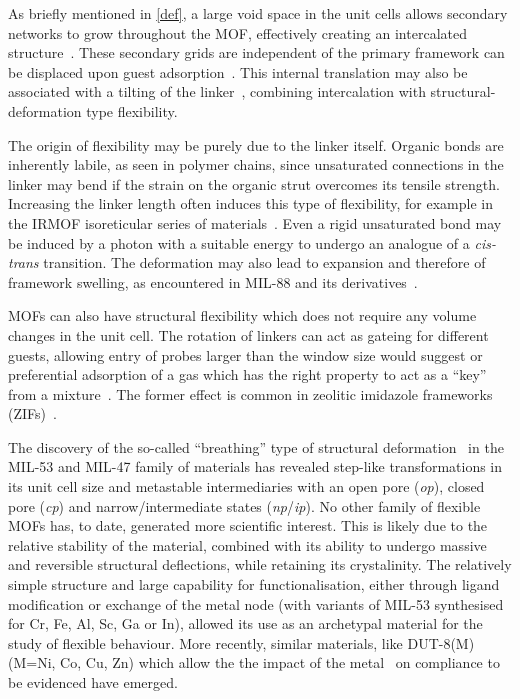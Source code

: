 As briefly mentioned in \autoref{def}, a large void 
space in the unit cells allows secondary networks 
to grow throughout the \gls{MOF}, effectively creating an 
intercalated structure~\cite{kepertVersatileFamilyInterconvertible2000,%
kitauraPorousCoordinationPolymerCrystals2003}. 
These secondary grids are independent
of the primary framework can be displaced upon guest 
adsorption~\cite{majiFlexibleInterpenetratingCoordination2007}. 
This internal translation may also be associated 
with a tilting of the 
linker~\cite{sakataShapeMemoryNanoporesInduced2013},
combining intercalation with structural-deformation type 
flexibility.

The origin of flexibility may be purely due to the linker 
itself. Organic bonds are inherently labile, as seen in 
polymer chains, since unsaturated connections in the linker may
bend if the strain on the organic strut overcomes its tensile 
strength. Increasing the linker length often induces this 
type of flexibility, for example in the IRMOF isoreticular series
of materials~\cite{nelsonSupercriticalProcessingRoute2009}.
Even a rigid unsaturated bond may be induced by a photon with a 
suitable energy to undergo an analogue of a \textit{cis-trans}
transition. The deformation may also lead to expansion and 
therefore of framework swelling,
as encountered in MIL-88 and its
derivatives~\cite{maIronBasedMetalOrganic2013}.

\glspl{MOF} can also have structural flexibility which does not
require any volume changes in the unit cell. The rotation of linkers
can act as gateing for different guests, allowing entry of probes
larger than the window size would suggest or preferential adsorption
of a gas which has the right property to act as a ``key'' from 
a mixture~\cite{seoPillaredLayerCoordinationPolymer2009}. 
The former effect is common in zeolitic imidazole frameworks 
(ZIFs)~\cite{fairen-jimenezOpeningGateFramework2011}.

The discovery of the so-called ``breathing'' type of structural
deformation~\cite{loiseauRationaleLargeBreathing2004, %
bourrellyDifferentAdsorptionBehaviors2005, %
    serreExplanationVeryLarge2007} in the MIL-53 and MIL-47 family of
materials has revealed step-like transformations in its unit cell
size and metastable intermediaries with an open pore (\textit{op}), 
closed pore (\textit{cp}) and narrow/intermediate states 
(\textit{np}/\textit{ip}).
No other family of flexible \glspl{MOF} has, to date, generated
more scientific interest. This is likely due to the relative 
stability of the material, combined with its ability to undergo massive 
and reversible structural deflections, while retaining its 
crystalinity. The relatively simple structure and large capability 
for functionalisation, either through ligand modification or exchange
of the metal node (with variants of MIL-53 synthesised for Cr, Fe, Al,
Sc, Ga or In), allowed its use as an archetypal material 
for the study of flexible behaviour. More recently, similar 
materials, like DUT-8(M) (M=Ni, Co, Cu, Zn) which allow the the 
impact of the 
metal~\cite{kleinStructuralFlexibilityIntrinsic2012} on
compliance to be evidenced have emerged.

